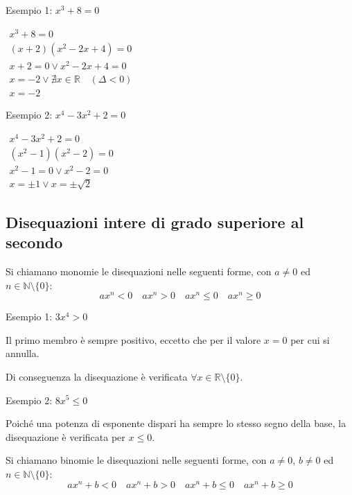 \documentclass[a4paper]{article}
\theoremstyle{plain}
\theoremstyle{definition}
\theoremstyle{remark}
\newcommand{\N}{\mathbb{N}}
\newcommand{\R}{\mathbb{R}}
\newcommand{\set}[1]{\{#1\}}
\begin{document}
Esempio 1: $x^3+8=0$

$\begin{array}{l}
    x^3+8=0\\
    (x+2)(x^2-2x+4)=0\\
    x+2=0\lor x^2-2x+4=0\\
    x=-2\lor\nexists x\in\R\quad(\Delta<0)\\
    x=-2
\end{array}$

Esempio 2: $x^4-3x^2+2=0$

$\begin{array}{l}
    x^4-3x^2+2=0\\
    (x^2-1)(x^2-2)=0\\
    x^2-1=0\lor x^2-2=0\\
    x=\pm1\lor x=\pm\sqrt{2}
\end{array}$

\newpage
\subsection{Disequazioni intere di grado superiore al secondo}
Si chiamano monomie le disequazioni nelle seguenti forme, con $a\ne0$ ed $n\in\N\setminus\set{0}$:
\begin{equation}
    ax^n<0\quad ax^n>0\quad ax^n\leq0\quad ax^n\geq0
\end{equation}

Esempio 1: $3x^4>0$

Il primo membro è sempre positivo, eccetto che per il valore $x=0$ per cui si annulla.

Di conseguenza la disequazione è verificata $\forall x\in\R\setminus\set{0}$.

Esempio 2: $8x^5\leq0$

Poiché una potenza di esponente dispari ha sempre lo stesso segno della base, la disequazione è verificata per $x\leq0$.

Si chiamano binomie le disequazioni nelle seguenti forme, con $a\neq0$, $b\neq0$ ed $n\in\N\setminus\set{0}$:
\begin{equation}
    ax^n+b<0\quad ax^n+b>0\quad ax^n+b\leq0\quad ax^n+b\geq0
\end{equation}
\end{document}
